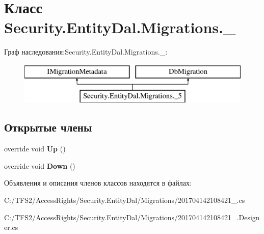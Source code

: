 \hypertarget{class_security_1_1_entity_dal_1_1_migrations_1_1__5}{}\section{Класс Security.\+Entity\+Dal.\+Migrations.\+\_}
\label{class_security_1_1_entity_dal_1_1_migrations_1_1__5}
Граф наследования\+:Security.\+Entity\+Dal.\+Migrations.\+\_\+:\begin{figure}[H]
\begin{center}
\leavevmode
\includegraphics[height=2.000000cm]{d6/dcb/class_security_1_1_entity_dal_1_1_migrations_1_1__5}
\end{center}
\end{figure}
\subsection*{Открытые члены}
\begin{DoxyCompactItemize}
\item 
\mbox{\label{class_security_1_1_entity_dal_1_1_migrations_1_1__5_a42c8c2ddd14808cfce51d32fca5477f9}} 
override void {\bfseries Up} ()
\item 
\mbox{\label{class_security_1_1_entity_dal_1_1_migrations_1_1__5_a0fee6a116c7b1aca980c3bafaf5f72e7}} 
override void {\bfseries Down} ()
\end{DoxyCompactItemize}


Объявления и описания членов классов находятся в файлах\+:\begin{DoxyCompactItemize}
\item 
C\+:/\+T\+F\+S2/\+Access\+Rights/\+Security.\+Entity\+Dal/\+Migrations/201704142108421\+\_.\+cs\item 
C\+:/\+T\+F\+S2/\+Access\+Rights/\+Security.\+Entity\+Dal/\+Migrations/201704142108421\+\_.\+Designer.\+cs\end{DoxyCompactItemize}
